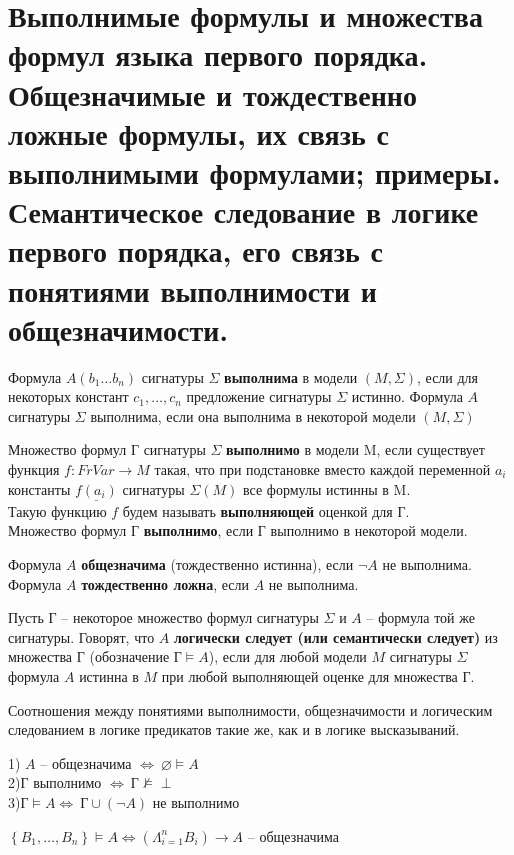 \section{Выполнимые формулы и множества формул языка первого порядка. Общезначимые и тождественно ложные формулы, их связь с выполнимыми формулами; примеры. Семантическое следование в логике первого порядка, его связь с понятиями выполнимости и общезначимости.}
\begin{definition}
    Формула $A(b_1\dots b_n)$ сигнатуры $\Sigma$ \textbf{выполнима} в модели $(M,\Sigma)$, если для некоторых констант $c_1,\dots,c_n$ предложение
    сигнатуры $\Sigma$ истинно. Формула $A$ сигнатуры $\Sigma$ выполнима, если она выполнима в некоторой модели $(M,\Sigma)$
\end{definition}
\begin{definition}
    Множество формул Г сигнатуры $\Sigma$ \textbf{выполнимо} в модели M, если существует функция $f: FrVar \rightarrow M$ такая, что при подстановке вместо каждой переменной $a_i$  константы $\underline{f(a_i)}$ сигнатуры $\Sigma(M)$ все формулы истинны в M.\\Такую функцию $f$ будем называть \textbf{выполняющей} оценкой для Г.\\ Множество формул Г \textbf{выполнимо}, если Г выполнимо в некоторой модели.
\end{definition}
\begin{definition}
    Формула $A$ \textbf{общезначима} (тождественно истинна), если $\neg A$ не выполнима.\\
    Формула $A$ \textbf{тождественно ложна}, если $A$ не выполнима.
\end{definition}
\begin{definition}
    Пусть Г -- некоторое множество формул сигнатуры $\Sigma$ и $A$ -- формула той же сигнатуры. Говорят, что $A$ \textbf{логически следует (или семантически следует)} из множества Г (обозначение $\text{Г}\vDash A$), если для любой модели $M$ сигнатуры $\Sigma$ формула $A$ истинна в $M$ при любой выполняющей оценке для множества Г. \label{formula7}
\end{definition}
Соотношения между понятиями выполнимости, общезначимости и логическим следованием в логике предикатов такие же, как и в логике высказываний.
\begin{proposition}
    1) $A$ -- общезначима $\Longleftrightarrow \: \varnothing \vDash A$\\
    2)Г выполнимо  $\Longleftrightarrow \:\text{Г}\nvDash \perp$\\
    3)$\text{Г} \vDash A \Longleftrightarrow \: \text{Г}\cup (\neg A)$ не выполнимо
\end{proposition}
\begin{proposition}
    $\left\{B_{1}, \ldots, B_{n}\right\} \vDash A \Longleftrightarrow\left(\Lambda_{i=1}^{n} B_{i}\right) \rightarrow A$ -- общезначима
\end{proposition}